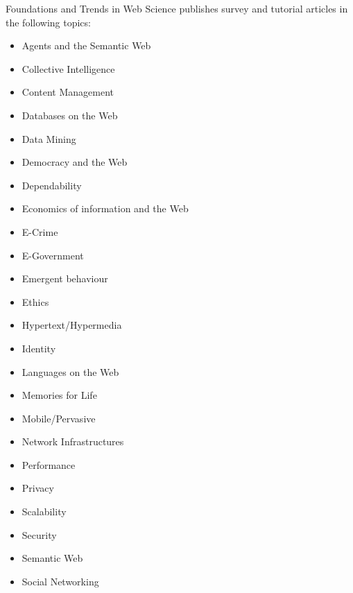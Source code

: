 


\journalaimsandscope
 {%
  Foundations and Trends\textsuperscript{\textregistered} in
Web Science publishes
 survey and tutorial articles in the following topics: 
\begin{multicols}{2}\raggedcolumns
\begin{itemize}
\item{Agents and the Semantic Web}
    \item{Collective Intelligence}
    \item{Content Management}
    \item{Databases on the Web}
    \item{Data Mining}
    \item{Democracy and the Web}
    \item{Dependability}
    \item{Economics of information and the Web}
    \item{E-Crime}
    \item{E-Government}
    \item{Emergent behaviour}
    \item{Ethics}
    \item{Hypertext/Hypermedia}
    \item{Identity}
    \item{Languages on the Web}
    \item{Memories for Life}
    \item{Mobile/Pervasive}
    \item{Network Infrastructures}
    \item{Performance}
    \item{Privacy}
    \item{Scalability}
    \item{Security}
    \item{Semantic Web}
    \item{Social Networking}

\end{itemize}
\end{multicols}}
